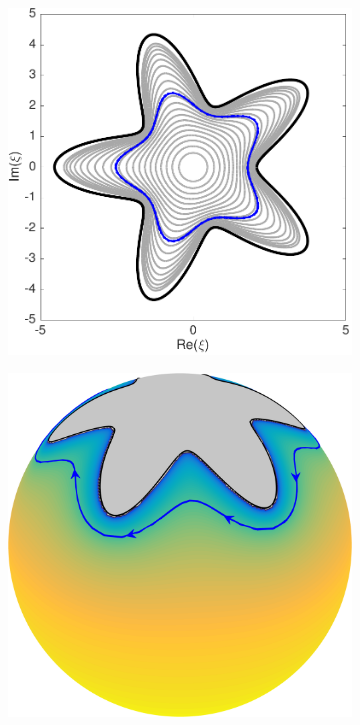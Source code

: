\documentclass{sfuthesis}
\begin{document}
\begin{figure}[h]
	\centering
  	\begin{subfigure}[b]{0.45\textwidth}
        		 \includegraphics[width=\textwidth]{Ex6-7StarSDCStereo}
	\caption{}
     	\end{subfigure} \hspace{1cm}
      	\begin{subfigure}[b]{0.4\textwidth}
       			\includegraphics[width=\textwidth]{Ex6-7StarSDC}

\end{subfigure}
\end{figure}
\end{document}

